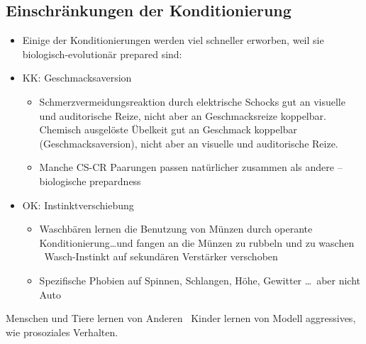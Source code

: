 \subsection{Einschränkungen der Konditionierung}
\begin{itemize}
	\item Einige der Konditionierungen werden viel schneller erworben, weil sie biologisch-evolutionär \glqq{}prepared\grqq{} sind:
	\item KK: Geschmacksaversion
		\begin{itemize}
			\item Schmerzvermeidungsreaktion durch elektrische Schocks gut an visuelle und auditorische Reize, nicht aber an Geschmacksreize koppelbar. Chemisch ausgelöste Übelkeit gut an Geschmack koppelbar (Geschmacksaversion), nicht aber an visuelle und auditorische Reize.
			\item Manche CS-CR Paarungen passen \glqq{}natürlicher\grqq{} zusammen als andere – biologische \glqq{}prepardness\grqq{}
		\end{itemize}
	\item OK: Instinktverschiebung
		\begin{itemize}
			\item Waschbären lernen die Benutzung von Münzen durch operante Konditionierung…und fangen an die Münzen zu rubbeln und zu waschen \rightarrow\ Wasch-Instinkt auf sekundären Verstärker verschoben
			\item Spezifische Phobien auf Spinnen, Schlangen, Höhe, Gewitter \dots\ aber nicht Auto
		\end{itemize}
\end{itemize}
Menschen und Tiere lernen von Anderen \rightarrow\ Kinder lernen von Modell aggressives, wie prosoziales Verhalten. 





